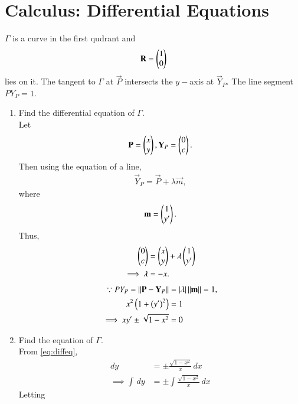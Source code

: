 \documentclass[journal,12pt,twocolumn]{IEEEtran}
\renewcommand\thesection{\arabic{section}}
\begin{document}
\section{Calculus: Differential Equations}
$\Gamma$ is a curve in the first qudrant and 
\begin{align}
\mathbf{R} = \begin{pmatrix}1 \\ 0\end{pmatrix}
\end{align}
%
lies on it.  The tangent to $\Gamma$ at $\vec{P}$ intersects the $y-$axis at $\vec{Y}_P$. The line segment $PY_P = 1$. 
%
\begin{enumerate}[label=\thesection.\arabic*
,ref=\thesection.\theenumi]
\item Find the differential equation of $\Gamma$.
\\
\solution Let 
\begin{align}
\mathbf{P}=\begin{pmatrix}x \\ y\end{pmatrix},
\mathbf{Y}_P=\begin{pmatrix}0 \\ c\end{pmatrix}.
\end{align}
%
Then using the equation of a line, 
\begin{align}
\vec{Y}_P=\vec{P} + \lambda \vec{m},
\end{align}
%
where 
\begin{align}
\mathbf{m}=\begin{pmatrix}1\\ y^{\prime}\end{pmatrix}.
\end{align}
%
Thus, 
\begin{align}
\begin{pmatrix}0 \\ c\end{pmatrix}&=\begin{pmatrix}x \\ y\end{pmatrix} + \lambda \begin{pmatrix}1\\ y^{\prime}\end{pmatrix}
\\
\implies \lambda &= -x.
\end{align}
\begin{align}
\because PY_P =  \left\Vert\mathbf{P}-\mathbf{Y}_P\right\Vert &= \left\vert\lambda\right\vert \left\Vert\mathbf{m}\right\Vert = 1,
\\
x^2\left(1 + \left(y^{\prime}\right)^2\right) &= 1
\\
\implies xy^{\prime}  \pm \sqrt{1-x^2} &= 0
\label{eq:diffeq}
\end{align}
%
\item Find the equation of $\Gamma$.
\\
\solution From \eqref{eq:diffeq},
\begin{align}
dy &=   \pm \frac{\sqrt{1-x^2}}{ x}\,dx
\\
\implies \int \, dy &=   \pm \int\frac{\sqrt{1-x^2}}{ x}\,dx
\end{align}
%
Letting 
\begin{align}

\end{align}
\end{enumerate}
\end{document}
